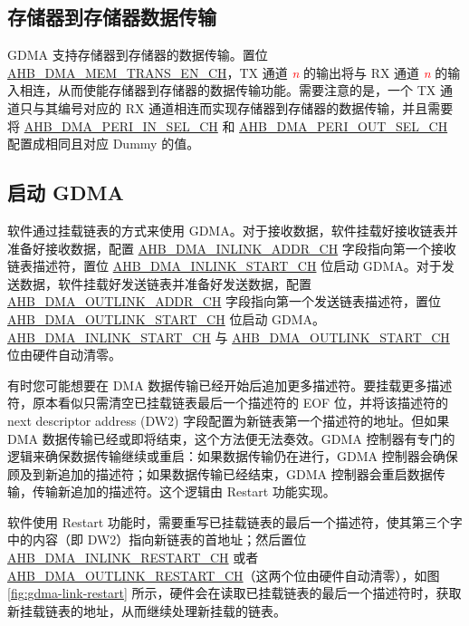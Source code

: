 \documentclass[main\_\_CN.tex]{subfiles}
\begin{document}
\subsection{存储器到存储器数据传输}
GDMA 支持存储器到存储器的数据传输。置位 \hyperref[fielddesc:AHBDMAMEMTRANSENCHN]{AHB\_DMA\_MEM\_TRANS\_EN\_CH}，TX 通道 \textcolor{red}{\it{n}} 的输出将与 RX 通道 \textcolor{red}{\it{n}} 的输入相连，从而使能存储器到存储器的数据传输功能。需要注意的是，一个 TX 通道只与其编号对应的 RX 通道相连而实现存储器到存储器的数据传输，并且需要将 \hyperref[fielddesc:AHBDMAPERIINSELCHN]{AHB\_DMA\_PERI\_IN\_SEL\_CH} 和 \hyperref[fielddesc:AHBDMAPERIOUTSELCHN]{AHB\_DMA\_PERI\_OUT\_SEL\_CH} 配置成相同且对应 Dummy 的值。

\subsection{启动 GDMA}

软件通过挂载链表的方式来使用 GDMA。对于接收数据，软件挂载好接收链表并准备好接收数据，配置 \hyperref[fielddesc:AHBDMAINLINKADDRCHN]{AHB\_DMA\_INLINK\_ADDR\_CH} 字段指向第一个接收链表描述符，置位 \hyperref[fielddesc:AHBDMAINLINKSTARTCHN]{AHB\_DMA\_INLINK\_START\_CH} 位启动 GDMA。对于发送数据，软件挂载好发送链表并准备好发送数据，配置 \hyperref[fielddesc:AHBDMAOUTLINKADDRCHN]{AHB\_DMA\_OUTLINK\_ADDR\_CH} 字段指向第一个发送链表描述符，置位 \hyperref[fielddesc:AHBDMAOUTLINKSTARTCHN]{AHB\_DMA\_OUTLINK\_START\_CH} 位启动 GDMA。\hyperref[fielddesc:AHBDMAINLINKSTARTCHN]{AHB\_DMA\_INLINK\_START\_CH} 与 \hyperref[fielddesc:AHBDMAOUTLINKSTARTCHN]{AHB\_DMA\_OUTLINK\_START\_CH} 位由硬件自动清零。

有时您可能想要在 DMA 数据传输已经开始后追加更多描述符。要挂载更多描述符，原本看似只需清空已挂载链表最后一个描述符的 EOF 位，并将该描述符的 next descriptor address (DW2) 字段配置为新链表第一个描述符的地址。但如果 DMA 数据传输已经或即将结束，这个方法便无法奏效。GDMA 控制器有专门的逻辑来确保数据传输继续或重启：如果数据传输仍在进行，GDMA 控制器会确保顾及到新追加的描述符；如果数据传输已经结束，GDMA 控制器会重启数据传输，传输新追加的描述符。这个逻辑由 Restart 功能实现。

软件使用 Restart 功能时，需要重写已挂载链表的最后一个描述符，使其第三个字中的内容（即 DW2）指向新链表的首地址；然后置位 \hyperref[fielddesc:AHBDMAINLINKRESTARTCHN]{AHB\_DMA\_INLINK\_RESTART\_CH} 或者 \hyperref[fielddesc:AHBDMAOUTLINKRESTARTCHN]{AHB\_DMA\_OUTLINK\_RESTART\_CH}（这两个位由硬件自动清零），如图 \ref{fig:gdma-link-restart} 所示，硬件会在读取已挂载链表的最后一个描述符时，获取新挂载链表的地址，从而继续处理新挂载的链表。
\end{document}
